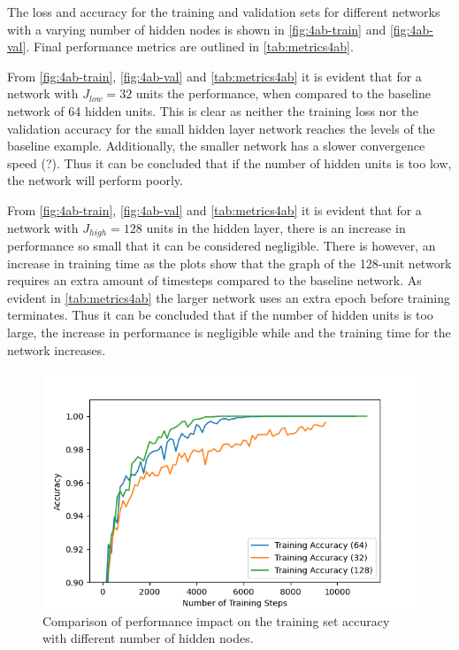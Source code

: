 \documentclass{article}
\begin{document}
The loss and accuracy for the training and validation sets for different networks with a varying number of hidden nodes is shown in \autoref{fig:4ab-train} and \autoref{fig:4ab-val}. Final performance metrics are outlined in \autoref{tab:metrics4ab}.

From \autoref{fig:4ab-train}, \autoref{fig:4ab-val} and \autoref{tab:metrics4ab} it is evident that for a network with $J_{low} = 32$ units the performance, when compared to the baseline network of 64 hidden units. This is clear as neither the training loss nor the validation accuracy for the small hidden layer network reaches the levels of the baseline example. Additionally, the smaller network has a slower convergence speed (?). Thus it can be concluded that if the number of hidden units is too low, the network will perform poorly.

From \autoref{fig:4ab-train}, \autoref{fig:4ab-val} and \autoref{tab:metrics4ab} it is evident that for a network with $J_{high} =128$ units in the hidden layer, there is an increase in performance so small that it can be considered negligible. There is however, an increase in training time as the plots show that the graph of the 128-unit network requires an extra amount of timesteps compared to the baseline network. As evident in \autoref{tab:metrics4ab} the larger network uses an extra epoch before training terminates. Thus it can be concluded that if the number of hidden units is too large, the increase in performance is negligible while and the training time for the network increases. 


\begin{figure}[H]
    \centering
    \includegraphics[width=\textwidth]{Assignments/Assignment_2/plots/task4/task4ab_train_acc.png}
    \caption{Comparison of performance impact on the training set accuracy with different number of hidden nodes.}
    \label{fig:4ab-train}
\end{figure}
\end{document}
